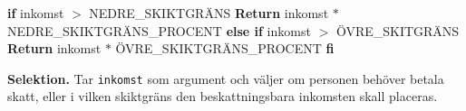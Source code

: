 \documentclass[../main.tex]{subfiles}
\begin{document}
\begin{algorithm}[H]
\SetAlgoLined


 \textbf{if} inkomst $>$ NEDRE\_SKIKTGRÄNS\;
 \textbf{Return} inkomst $*$ NEDRE\_SKIKTGRÄNS\_PROCENT\;
 \textbf{else if} inkomst $>$ ÖVRE\_SKITGRÄNS\;
 \textbf{Return} inkomst $*$ ÖVRE\_SKIKTGRÄNS\_PROCENT\;
 \textbf{fi}\;
 
 \caption{\textbf{Selektion.} Tar \texttt{inkomst} som argument och väljer om personen behöver betala skatt, eller i vilken skiktgräns den beskattningsbara inkomsten skall placeras.}
 
\end{algorithm}
\end{document}
